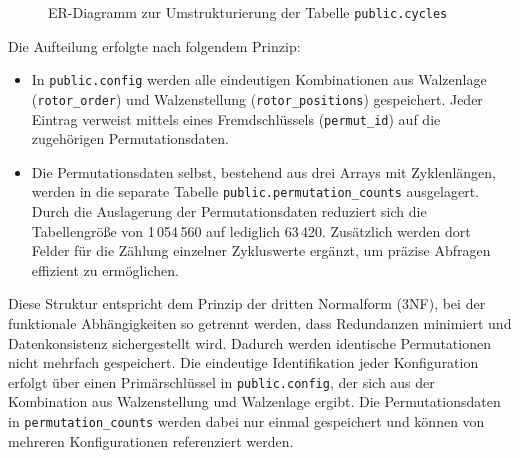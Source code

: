 \documentclass[12pt, ngerman, a4paper, numbers=noenddot]{article}
\begin{document}
\begin{figure}[h!]
	\centering
	\caption{ER-Diagramm zur Umstrukturierung der Tabelle \lstinline|public.cycles|}
\end{figure}

Die Aufteilung erfolgte nach folgendem Prinzip:
\begin{itemize}
	\item In \lstinline|public.config| werden alle eindeutigen Kombinationen aus Walzenlage (\lstinline|rotor_order|) und Walzenstellung (\lstinline|rotor_positions|) gespeichert. Jeder Eintrag verweist mittels eines Fremdschlüssels (\lstinline|permut_id|) auf die zugehörigen Permutationsdaten.
	
	\item Die Permutationsdaten selbst, bestehend aus drei Arrays mit Zyklenlängen, werden in die separate Tabelle \lstinline|public.permutation_counts| ausgelagert. Durch die Auslagerung der Permutationsdaten reduziert sich die Tabellengröße von 1\,054\,560 auf lediglich 63\,420. Zusätzlich werden dort Felder für die Zählung einzelner Zykluswerte ergänzt, um präzise Abfragen effizient zu ermöglichen.
\end{itemize}

Diese Struktur entspricht dem Prinzip der dritten Normalform (3NF), bei der funktionale Abhängigkeiten so getrennt werden, dass Redundanzen minimiert und Datenkonsistenz sichergestellt wird. Dadurch werden identische Permutationen nicht mehrfach gespeichert. Die eindeutige Identifikation jeder Konfiguration erfolgt über einen Primärschlüssel in \lstinline|public.config|, der sich aus der Kombination aus Walzenstellung und Walzenlage ergibt. Die Permutationsdaten in \lstinline|permutation_counts| werden dabei nur einmal gespeichert und können von mehreren Konfigurationen referenziert werden.
\end{document}
